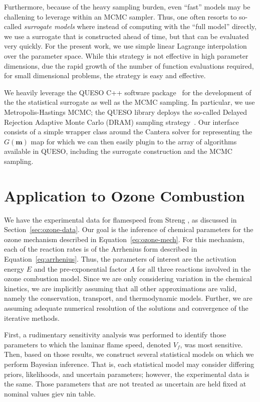  Furthermore, because of the heavy sampling burden, even ``fast''
 models may be challening to leverage within an MCMC sampler. Thus,
 one often resorts to so-called \emph{surrogate models} where instead of
 computing with the ``full model'' directly, we use a surrogate that
 is constructed ahead of time, but that can be evaluated very
 quickly. For the present work, we use simple linear Lagrange
 interpolation over the parameter space. While this strategy is not
 effective in high parameter dimensions, due the rapid growth of the
 number of function evaluations required, for small dimensional
 problems, the strategy is easy and effective.

 We heavily leverage the QUESO C++ software package~\cite{QUESO} for the
 development of the the statistical surrogate as well as the MCMC
 sampling. In particular, we use Metropolis-Hastings MCMC; the QUESO
 library deploys the so-called Delayed Rejection Adaptive Monte Carlo
 (DRAM) sampling strategy~\cite{DRAM}. Our interface consists of a
 simple wrapper class around the Cantera solver for representing the
 $G(\mathbf{m})$ map for which we can then easily plugin to the array
 of algorithms available in QUESO, including the surrogate
 construction and the MCMC sampling.

\section{Application to Ozone Combustion}

 We have the experimental data for flamespeed from Streng
 \cite{Streng}, as discussed in Section~\ref{sec:ozone-data}.
 Our goal is the inference of
 chemical parameters for the ozone mechanism described in
 Equation~\eqref{eq:ozone-mech}. For this mechanism, each of the
 reaction rates is of the Arrhenius form described in
 Equation~\eqref{eq:arrhenius}.
 Thus, the parameters of interest are the
 activation energy $E$ and the
 pre-exponential factor $A$ for all three reactions involved in the
 ozone combustion model. Since we are only considering variation in
 the chemical kinetics, we are implicitly assuming that all other
 approximations are valid, namely the conservation, transport, and
 thermodynamic models. Further, we are assuming adequate numerical
 resolution of the solutions and convergence of the iterative methods.

 First, a rudimentary sensitivity analysis was performed to identify
 those parameters to which the laminar flame speed, denoted $V_f$, was most
 sensitive. Then, based on those results, we construct several
 statistical models on which we perform Bayesian inference. That is,
 each statistical model may consider differing priors, likelihoods,
 and uncertain parameters; however, the experimental data is the
 same. Those parameters that are not treated as uncertain are held
 fixed at nominal values giev nin table.

